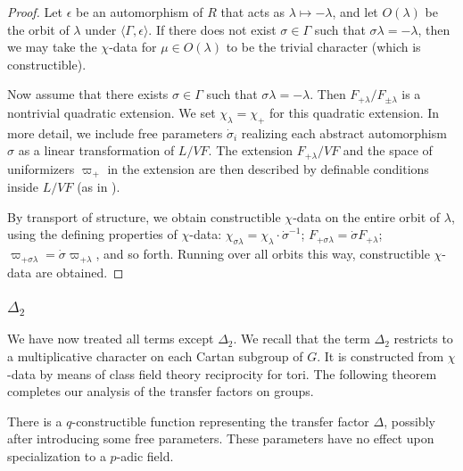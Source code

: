 \begin{proof}
Let $\epsilon$ be an automorphism of $R$ that acts as $\lambda\mapsto
-\lambda$, and let $O(\lambda)$ be the orbit of $\lambda$ under
$\langle\Gamma,\epsilon\rangle$.  If there does not exist
$\sigma\in\Gamma$ such that $\sigma\lambda=-\lambda$, then we may take
the $\chi$-data for $\mu\in O(\lambda)$ to be the trivial character
(which is constructible).

Now assume that there exists $\sigma\in\Gamma$ such that
$\sigma\lambda = -\lambda$.  Then $F_{+\lambda}/F_{\pm \lambda}$ is a
nontrivial quadratic extension.  We set $\chi_\lambda = \chi_+$ for
this quadratic extension.  In more detail, we include free parameters
$\dot\sigma_i$ realizing each abstract automorphism $\sigma$ as a
linear transformation of $L/VF$.  The extension $F_{+\lambda}/VF$ and
the space of uniformizers $\varpi_+$ in the extension are then
described by definable conditions inside $L/VF$ (as in
\cite{cluckers2011transfer}).

By transport of structure, we obtain constructible $\chi$-data on the
entire orbit of $\lambda$, using the defining properties of
$\chi$-data: $\chi_{\sigma\lambda} = \chi_{\lambda}\cdot
\dot\sigma^{-1}$; $F_{+\sigma\lambda}=\dot\sigma F_{+\lambda}$;
$\varpi_{+\sigma\lambda}=\dot\sigma\varpi_{+\lambda}$, and so forth.
Running over all orbits this way, constructible $\chi$-data are
obtained.
\end{proof}


\subsubsection{$\Delta_2$}

We have now treated all terms except $\Delta_2$.  We recall that the
term $\Delta_2$ restricts to a multiplicative character on each Cartan
subgroup of $G$.  It is constructed from $\chi$-data by means of class
field theory reciprocity for tori.  The following theorem completes
our analysis of the transfer factors on groups.

\begin{theorem}\label{thm:delta2}  
  There is a $q$-constructible function representing the transfer
  factor $\Delta$, possibly after introducing some free parameters.
  These parameters have no effect upon specialization to a $p$-adic
  field.
\end{theorem}

